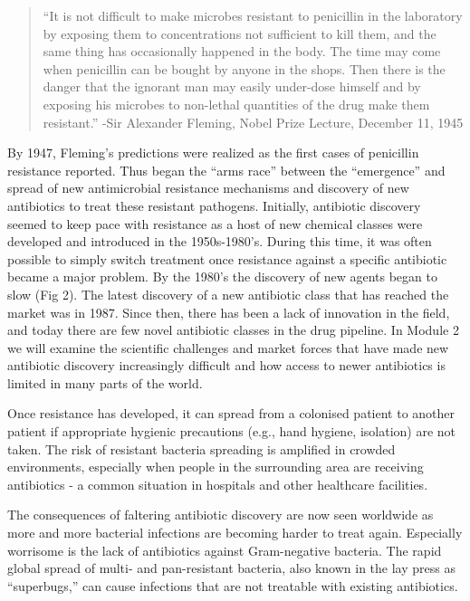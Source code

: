 \documentclass[]{tufte-handout}
\begin{document}
\begin{quote}
``It is not difficult to make microbes resistant to penicillin in the
laboratory by exposing them to concentrations not sufficient to kill
them, and the same thing has occasionally happened in the body. The time
may come when penicillin can be bought by anyone in the shops. Then
there is the danger that the ignorant man may easily under-dose himself
and by exposing his microbes to non-lethal quantities of the drug make
them resistant.'' -Sir Alexander Fleming, Nobel Prize Lecture, December
11, 1945
\end{quote}

By 1947, Fleming's predictions were realized as the first cases of
penicillin resistance reported. Thus began the ``arms race'' between the
``emergence'' and spread of new antimicrobial resistance mechanisms and
discovery of new antibiotics to treat these resistant pathogens.
Initially, antibiotic discovery seemed to keep pace with resistance as a
host of new chemical classes were developed and introduced in the
1950s-1980's. During this time, it was often possible to simply switch
treatment once resistance against a specific antibiotic became a major
problem. By the 1980's the discovery of new agents began to slow (Fig
2). The latest discovery of a new antibiotic class that has reached the
market was in 1987. Since then, there has been a lack of innovation in
the field, and today there are few novel antibiotic classes in the drug
pipeline. In Module 2 we will examine the scientific challenges and
market forces that have made new antibiotic discovery increasingly
difficult and how access to newer antibiotics is limited in many parts
of the world.

Once resistance has developed, it can spread from a colonised patient to
another patient if appropriate hygienic precautions (e.g., hand hygiene,
isolation) are not taken. The risk of resistant bacteria spreading is
amplified in crowded environments, especially when people in the
surrounding area are receiving antibiotics - a common situation in
hospitals and other healthcare facilities.

The consequences of faltering antibiotic discovery are now seen
worldwide as more and more bacterial infections are becoming harder to
treat again. Especially worrisome is the lack of antibiotics against
Gram-negative bacteria. The rapid global spread of multi- and
pan-resistant bacteria, also known in the lay press as ``superbugs,''
can cause infections that are not treatable with existing antibiotics.
\end{document}
